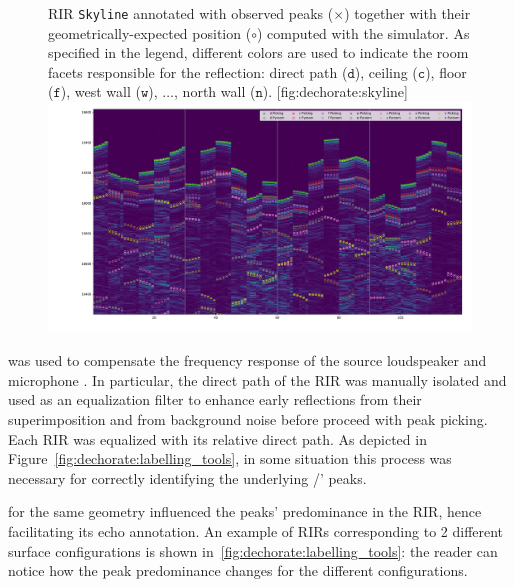 \begin{figure}
    \begin{sidecaption}[]{
        \ac{RIR} \texttt{Skyline} annotated with observed peaks ($\times$) together with their geometrically-expected position ($\circ{}$) computed with the  simulator.
        As specified in the legend, different colors are used to indicate the room facets responsible for the reflection: direct path ($\mathtt{d}$), ceiling ($\mathtt{c}$), floor ($\mathtt{f}$), west wall ($\mathtt{w}$), $\dots$, north wall ($\mathtt{n}$).
    }[fig:dechorate:skyline]
    \centering
    \includegraphics[trim={15em 15em 2em 0},clip,width=\linewidth]{figures/dechorate/rir_skyline_final_mod4paper.pdf}
    \end{sidecaption}
\end{figure}

 was used to compensate the frequency response of the source loudspeaker and microphone .
In particular, the direct path of the RIR was manually isolated and used as an equalization filter to enhance early reflections from their superimposition and from background noise before proceed with peak picking.
Each \ac{RIR} was equalized with its relative direct path.
As depicted in Figure~\ref{fig:dechorate:labelling_tools}, in some situation this process was necessary for correctly identifying the underlying \TOAs/' peaks.

 for the same geometry influenced the peaks' predominance in the \ac{RIR}, hence facilitating its echo annotation.
An example of \acp{RIR} corresponding to 2 different surface configurations is shown in~\cref{fig:dechorate:labelling_tools}: the reader can notice how the peak predominance changes for the different configurations.

